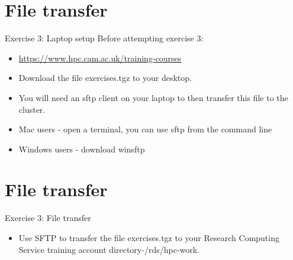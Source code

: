 \documentclass{beamer}
\begin{document}
\section{File transfer}
\begin{frame}{Exercise 3: Laptop setup}
Before attempting exercise 3:
\begin{itemize}
\item{\url{https://www.hpc.cam.ac.uk/training-courses}}
\item{Download the file \alert{exercises.tgz} to your desktop.}
\item{You will need an sftp client on your laptop to then transfer this file to the cluster.}
\item{Mac users - open a terminal, you can use sftp from the command line}
\item{Windows users - download winsftp}
\end{itemize}
\end{frame}

\section{File transfer}
\begin{frame}{Exercise 3: File transfer}
\begin{itemize}
\item{Use SFTP to transfer the file \alert{exercises.tgz} to your Research Computing Service training account directory $\tilde{}$/rds/hpc-work.}
\end{itemize}
\end{frame}
    
\end{document}
